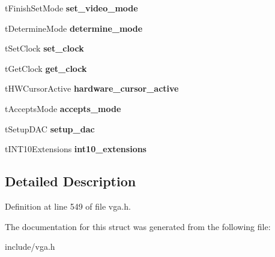 \begin{DoxyCompactItemize}
\item 
\hypertarget{structSVGA__Driver_afad168056782b84b2eec03c3e0b6f132}{t\-Finish\-Set\-Mode {\bfseries set\-\_\-video\-\_\-mode}}\label{structSVGA__Driver_afad168056782b84b2eec03c3e0b6f132}

\item 
\hypertarget{structSVGA__Driver_a2d72eb682afc752821c0f1ec4e3d0ce3}{t\-Determine\-Mode {\bfseries determine\-\_\-mode}}\label{structSVGA__Driver_a2d72eb682afc752821c0f1ec4e3d0ce3}

\item 
\hypertarget{structSVGA__Driver_a59225904a80dbe9f92d9ba2ee227e1f8}{t\-Set\-Clock {\bfseries set\-\_\-clock}}\label{structSVGA__Driver_a59225904a80dbe9f92d9ba2ee227e1f8}

\item 
\hypertarget{structSVGA__Driver_a209ef280bb27f00d2226050998cd5cb0}{t\-Get\-Clock {\bfseries get\-\_\-clock}}\label{structSVGA__Driver_a209ef280bb27f00d2226050998cd5cb0}

\item 
\hypertarget{structSVGA__Driver_a3936aa6067ba314fe1aa38fbc89933cd}{t\-H\-W\-Cursor\-Active {\bfseries hardware\-\_\-cursor\-\_\-active}}\label{structSVGA__Driver_a3936aa6067ba314fe1aa38fbc89933cd}

\item 
\hypertarget{structSVGA__Driver_a80ae597edcf43eeb150550b23752729c}{t\-Accepts\-Mode {\bfseries accepts\-\_\-mode}}\label{structSVGA__Driver_a80ae597edcf43eeb150550b23752729c}

\item 
\hypertarget{structSVGA__Driver_a5968c7cd8b28c97aea5860fbe6433e02}{t\-Setup\-D\-A\-C {\bfseries setup\-\_\-dac}}\label{structSVGA__Driver_a5968c7cd8b28c97aea5860fbe6433e02}

\item 
\hypertarget{structSVGA__Driver_aff7ace887c47e1f700375eb6324b1d91}{t\-I\-N\-T10\-Extensions {\bfseries int10\-\_\-extensions}}\label{structSVGA__Driver_aff7ace887c47e1f700375eb6324b1d91}

\end{DoxyCompactItemize}


\subsection{Detailed Description}


Definition at line 549 of file vga.\-h.



The documentation for this struct was generated from the following file\-:\begin{DoxyCompactItemize}
\item 
include/vga.\-h\end{DoxyCompactItemize}
